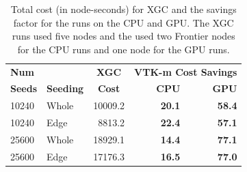 \begin{table}[]
\centering
\caption{Total cost (in node-seconds) for XGC and the savings factor for the \vtkm runs on the CPU and GPU.
The XGC runs used five nodes and the \vtkm used two Frontier nodes for the CPU runs and one node for the GPU runs.
}
\label{table:costSavings}
\begin{tabular}{ll|r|rr}
\hline
\textbf{Num} & \multicolumn{1}{c|}{} & \multicolumn{1}{c|}{\textbf{XGC}} & \multicolumn{2}{c}{\textbf{VTK-m Cost Savings}} \\
\textbf{Seeds} & \textbf{Seeding} & \multicolumn{1}{c|}{\textbf{Cost}} & \textbf{CPU} & \textbf{GPU} \\ \hline \hline
10240 & Whole & 10009.2 & \textbf{20.1} & \textbf{58.4} \\
10240 & Edge & 8813.2 & \textbf{22.4} & \textbf{57.1} \\
25600 & Whole & 18929.1 & \textbf{14.4} & \textbf{77.1} \\
25600 & Edge & 17176.3 & \textbf{16.5} & \textbf{77.0} \\ \hline
\end{tabular}
\end{table}

